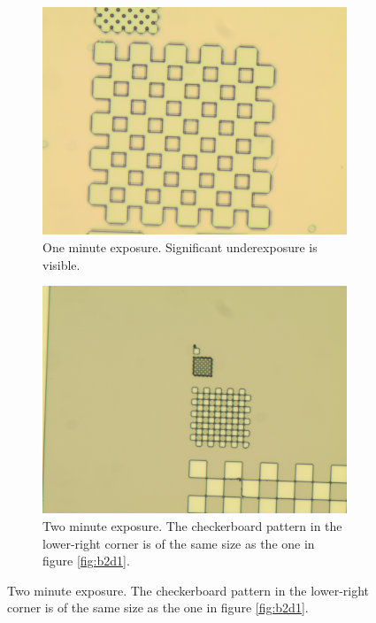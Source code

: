 \begin{figure}[!b]
    \centering
    \begin{subfigure}[t]{0.3\linewidth}
        \centering
        \includegraphics[width=\textwidth]{data/b3d1.jpg}
        \caption{One minute exposure. Significant underexposure is visible.}
        \label{fig:b3d1}
    \end{subfigure}
    \hfill
    \begin{subfigure}[t]{0.3\linewidth}
        \centering
        \includegraphics[width=\textwidth]{data/b3a1.jpg}
        \caption{Two minute exposure. The checkerboard pattern in the lower-right corner is of the same size as the one in figure \ref{fig:b2d1}.}
        \label{fig:b3a1}

\end{subfigure}
\end{figure}
